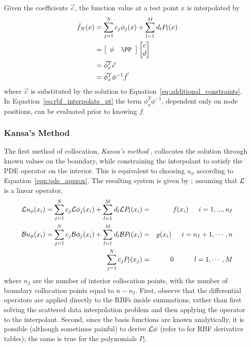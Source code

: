 \documentclass{report}
\begin{document}
{Given the coefficients $\vec{c}$, the function value at a test point $x$ is interpolated by
\begin{align}	 
	\hat{f}_N(x) &= \sum_{j=1}^{N}c_j \phi_j(x) + \sum_{l=1}^{M}d_l P_l(x)  \nonumber \\
	&=  \left[\begin{array}{cc}
        \phi & \PP
	\end{array} \right] 
	 \begin{bmatrix}	c \\
					d
		 \end{bmatrix} \nonumber \\
						 &= \vec{\phi}_x^T \vec{c} \nonumber \\
						 &= \vec{\phi}_x^T \phi^{-1}\vec{f}	
						 \label{eq:rbf_interpolate_pt}
\end{align}
where $\vec{c}$ is substituted by the solution to Equation~\ref{eq:additional_constraints}. In Equation~\ref{eq:rbf_interpolate_pt} the term $\phi_{x}^T\phi^{-1}$, dependent only on node positions, can be evaluated prior to knowing $f$. 



\subsubsection{Kansa's Method}

The first method of collocation, \emph{Kansa's method} \cite{Kansa1990a, Kansa1990b}, collocates the solution through known values on the boundary, while constraining the interpolant to satisfy the PDE operator on the interior. This is equivalent to choosing $u_\phi$ according to Equation~\ref{eqn:pde_approx}. The resulting system is given by \cite{Mouat2002}; assuming that $\mathcal{L}$ is a linear operator, 
\begin{eqnarray}
\mathcal{L}u_\phi(x_i) = \sum_{j=1}^{N}c_j\mathcal{L}\phi_j(x_i) + \sum_{l=1}^{M}d_l \mathcal{L}P_l(x_i) &=&f(x_i)  \hskip1.5em i = 1,...,n_I  \label{eqn:kansa_interior} \\ 
\mathcal{B}u_\phi(x_i) = \sum_{j=1}^{N}c_j \mathcal{B}\phi_j(x_i) + \sum_{l=1}^{M}d_l \mathcal{B}P_l(x_i) &=& g(x_i)  \hskip1.5em i = n_I + 1, \cdots, n \label{eqn:kansa_boundary} \\
\sum_{j=1}^{N} c_j P_l(x_j) & = & 0 \hskip3.0em l=1,\cdots,M \label{eqn:kansa_moments} 
\end{eqnarray}
where $n_I$ are the number of interior collocation points, with the number of boundary collocation points equal to $n - n_I$. First, observe that the differential operators are applied directly to the RBFs inside summations, rather than first solving the scattered data interpolation problem and then applying the operator to the interpolant.  Second, since the basis functions are known analytically, it is possible (although sometimes painful) to derive $\mathcal{L}\phi$ (refer to \cite{Fasshauer2007} for RBF derivative tables); the same is true for the polynomials $P_l$. 

}
\end{document}
